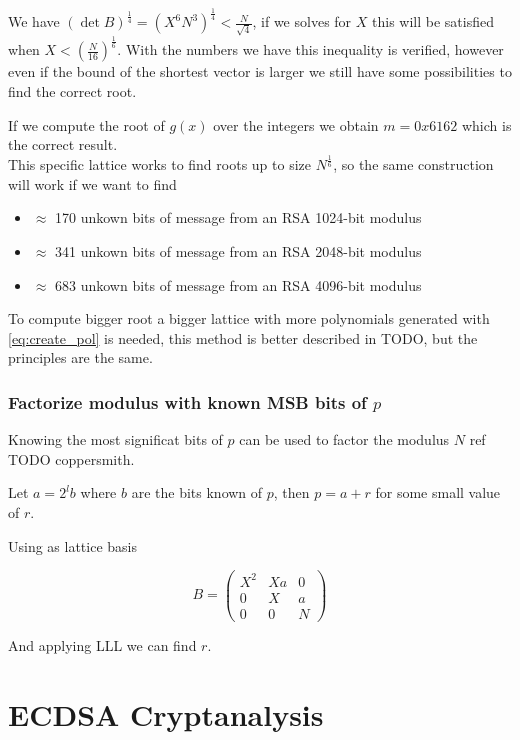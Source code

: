 \documentclass[a4paper,12pt]{report}
\begin{document}
We have $(\det B)^{\frac{1}{4}} = (X^6N^3)^{\frac{1}{4}} < \frac{N}{\sqrt{4}}$, if we solves for $X$ this will be satisfied when $X < (\frac{N}{16})^{\frac{1}{6}}$.
With the numbers we have this inequality is verified, however even if the bound of the shortest vector is larger we still have some possibilities to
find the correct root.

If we compute the root of $g(x)$ over the integers we obtain $m = 0x6162$ which is the correct result.\\

This specific lattice works to find roots up to size $N^{\frac{1}{6}}$, so the same construction will work if we want to find

\begin{itemize}
    \item $\approx$ 170 unkown bits of message from an RSA 1024-bit modulus
    \item $\approx$ 341 unkown bits of message from an RSA 2048-bit modulus
    \item $\approx$ 683 unkown bits of message from an RSA 4096-bit modulus
\end{itemize}

To compute bigger root a bigger lattice with more polynomials generated with \ref{eq:create_pol} is needed,
this method is better described in TODO, but the principles are the same.

\subsection{Factorize modulus with known MSB bits of $p$}

Knowing the most significat bits of $p$ can be used to factor the modulus $N$ ref TODO coppersmith.

Let $a = 2^lb$ where $b$ are the bits known of $p$, then $p = a + r$ for some small value of $r$.

Using as lattice basis

\[
    B = 
    \begin{pmatrix}
        X^2 & Xa & 0 \\
        0 & X & a \\
        0 & 0 & N
    \end{pmatrix} 
\]

And applying LLL we can find $r$.

\chapter{ECDSA Cryptanalysis}
\end{document}
